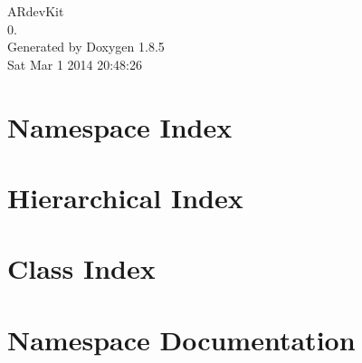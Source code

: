 \documentclass[twoside]{book}
\newcommand{\clearemptydoublepage}{%
  \newpage{\pagestyle{empty}\cleardoublepage}%
}
\begin{document}
\hypersetup{pageanchor=false}
\begin{titlepage}
\vspace*{7cm}
\begin{center}%
{\Large A\-Rdev\-Kit \\[1ex]\large 0. }\\
\vspace*{1cm}
{\large Generated by Doxygen 1.8.5}\\
\vspace*{0.5cm}
{\small Sat Mar 1 2014 20:48:26}\\
\end{center}
\end{titlepage}
\clearemptydoublepage
\tableofcontents
\clearemptydoublepage
{}
\hypersetup{pageanchor=true}

\chapter{Namespace Index}

\chapter{Hierarchical Index}

\chapter{Class Index}

\chapter{Namespace Documentation}














\end{document}
